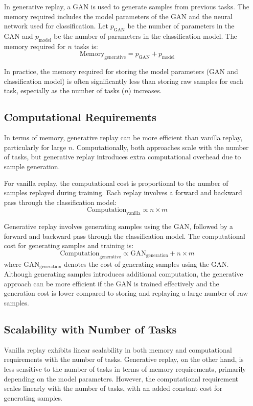 \documentclass{article}
\begin{document}
In generative replay, a GAN is used to generate samples from previous tasks. The memory required includes the model parameters of the GAN and the neural network used for classification. Let \(p_{\text{GAN}}\) be the number of parameters in the GAN and \(p_{\text{model}}\) be the number of parameters in the classification model. The memory required for \(n\) tasks is:
\[
\text{Memory}_{\text{generative}} = p_{\text{GAN}} + p_{\text{model}}
\]

In practice, the memory required for storing the model parameters (GAN and classification model) is often significantly less than storing raw samples for each task, especially as the number of tasks (\(n\)) increases.

\subsection{Computational Requirements}
In terms of memory, generative replay can be more efficient than vanilla replay, particularly for large \(n\). Computationally, both approaches scale with the number of tasks, but generative replay introduces extra computational overhead due to sample generation.

For vanilla replay, the computational cost is proportional to the number of samples replayed during training. Each replay involves a forward and backward pass through the classification model:
\[
\text{Computation}_{\text{vanilla}} \propto n \times m
\]

Generative replay involves generating samples using the GAN, followed by a forward and backward pass through the classification model. The computational cost for generating samples and training is:
\[
\text{Computation}_{\text{generative}} \propto \text{GAN}_{\text{generation}} + n \times m
\]
where \(\text{GAN}_{\text{generation}}\) denotes the cost of generating samples using the GAN. Although generating samples introduces additional computation, the generative approach can be more efficient if the GAN is trained effectively and the generation cost is lower compared to storing and replaying a large number of raw samples.


\subsection{Scalability with Number of Tasks}
Vanilla replay exhibits linear scalability in both memory and computational requirements with the number of tasks.
Generative replay, on the other hand, is less sensitive to the number of tasks in terms of memory requirements, primarily depending on the model parameters.
However, the computational requirement scales linearly with the number of tasks, with an added constant cost for generating samples.
\end{document}
